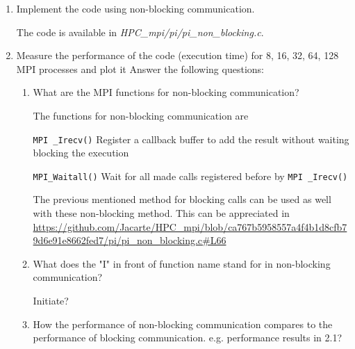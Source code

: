 \documentclass[12pt]{article}
\begin{document}
\begin{enumerate}
	\item Implement the code using non-blocking communication.
	
	The code is available in \textit{HPC\_mpi/pi/pi\_non\_blocking.c}.
	\item  Measure the performance of the code (execution time) for 8, 16, 32,  64, 128 MPI processes and plot it
	Answer the following questions:
	\begin{enumerate}
		\item What are the MPI functions for non-blocking communication? 
		
		The functions for non-blocking communication are 
		
		\texttt{MPI
		\_Irecv()} Register a callback buffer to add the result without waiting blocking the execution


		\texttt{MPI\_Waitall()} Wait for all made calls registered before by \texttt{MPI
		\_Irecv()}

		The previous mentioned method for blocking calls can be used as well with these non-blocking method. This can be appreciated in \url{https://github.com/Jacarte/HPC_mpi/blob/ca767b5958557a4f4b1d8cfb79d6e91e8662fed7/pi/pi_non_blocking.c#L66}

		

		\item What does the "I" in front of function name stand for in non-blocking communication?
		
		Initiate?

		\item How the performance of non-blocking communication compares to the performance of blocking communication. e.g. performance results in 2.1?
  

\end{enumerate}
\end{enumerate}
\end{document}
